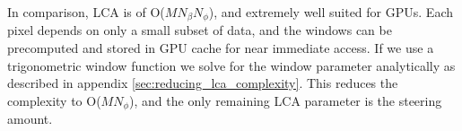 \documentclass[10pt,journal,draftclsnofoot,onecolumn]{IEEEtran}
\let\MYoriglatexcaption\caption               %
\renewcommand{\caption}[2][\relax]{\MYoriglatexcaption[#2]{#2}}
\newcommand\1{\vec 1}
\begin{document}
In comparison, LCA is of O($M N_\beta N_\phi$), and extremely well suited for GPUs. Each pixel depends on only a small subset of data, and the windows can be precomputed and stored in GPU cache for near immediate access. If we use a trigonometric window function we solve for the window parameter analytically as described in appendix \ref{sec:reducing_lca_complexity}. This reduces the complexity to O($M N_\phi$), and the only remaining LCA parameter is the steering amount.








\end{document}

